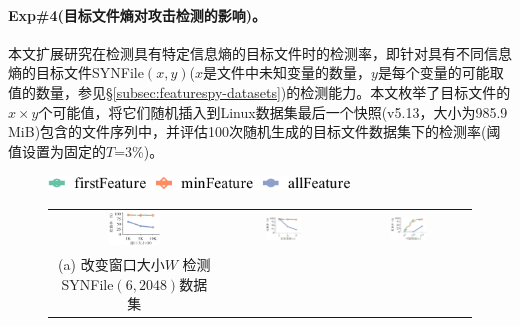 \paragraph*{Exp\#4(目标文件熵对攻击检测的影响)。}

本文扩展研究\sysnameF 在检测具有特定信息熵的目标文件时的检测率，即针对具有不同信息熵的目标文件SYNFile$(x, y)$($x$是文件中未知变量的数量，$y$是每个变量的可能取值的数量，参见\S\ref{subsec:featurespy-datasets})的检测能力。本文枚举了目标文件的$x\times y$个可能值，将它们随机插入到Linux数据集最后一个快照(v5.13，大小为985.9\,MiB)包含的文件序列中，并评估100次随机生成的目标文件数据集下\sysnameF 的检测率(阈值设置为固定的$T$=3\%)。

\begin{figure}[!htb]
    \centering
    \includegraphics[height=10.5pt]{pic/featurespy/plot/detection/trade-off/trade_off_legend.pdf}
    \vspace{5pt} \\
    \begin{tabular}{@{\ }c@{\ }c@{\ }c}
        \includegraphics[width=0.32\textwidth]{pic/featurespy/plot/detection/trade-off/varyWindow_linux.pdf}    &
        \includegraphics[width=0.32\textwidth]{pic/featurespy/plot/detection/trade-off/varyModifyPos_linux.pdf} &
        \includegraphics[width=0.32\textwidth]{pic/featurespy/plot/detection/trade-off/varyFileNumber_linux.pdf}  \\
        \makecell[c]{\small (a) 改变窗口大小$W$                                                                   \\ \small 检测SYNFile$(6,2048)$数据集} &

\end{tabular}
\end{figure}
